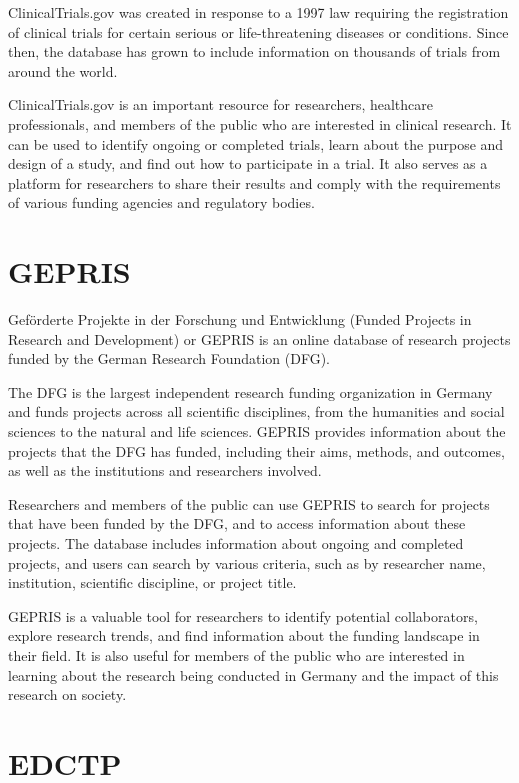 \documentclass[
]{book}
\begin{document}
ClinicalTrials.gov was created in response to a 1997 law requiring the registration of clinical trials for certain serious or life-threatening diseases or conditions. Since then, the database has grown to include information on thousands of trials from around the world.

ClinicalTrials.gov is an important resource for researchers, healthcare professionals, and members of the public who are interested in clinical research. It can be used to identify ongoing or completed trials, learn about the purpose and design of a study, and find out how to participate in a trial. It also serves as a platform for researchers to share their results and comply with the requirements of various funding agencies and regulatory bodies.

\hypertarget{gepris}{%
\section{GEPRIS}\label{gepris}}

Geförderte Projekte in der Forschung und Entwicklung (Funded Projects in Research and Development) or GEPRIS is an online database of research projects funded by the German Research Foundation (DFG).

The DFG is the largest independent research funding organization in Germany and funds projects across all scientific disciplines, from the humanities and social sciences to the natural and life sciences. GEPRIS provides information about the projects that the DFG has funded, including their aims, methods, and outcomes, as well as the institutions and researchers involved.

Researchers and members of the public can use GEPRIS to search for projects that have been funded by the DFG, and to access information about these projects. The database includes information about ongoing and completed projects, and users can search by various criteria, such as by researcher name, institution, scientific discipline, or project title.

GEPRIS is a valuable tool for researchers to identify potential collaborators, explore research trends, and find information about the funding landscape in their field. It is also useful for members of the public who are interested in learning about the research being conducted in Germany and the impact of this research on society.

\hypertarget{edctp}{%
\section{EDCTP}\label{edctp}}
\end{document}
